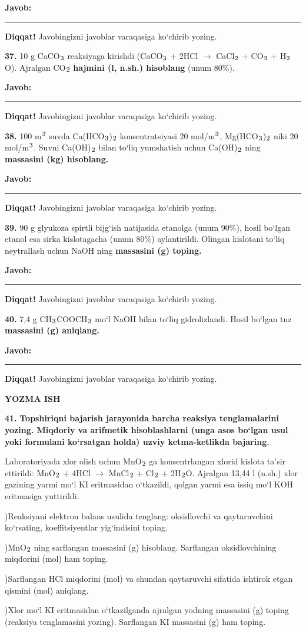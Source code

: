 \documentclass[11pt,a4paper]{article}
\renewcommand{\textsubscript}[1]{\ensuremath{_{\text{\fontsize{8}{8}\selectfont #1}}}}
\renewcommand{\textsuperscript}[1]{\ensuremath{^{\text{\fontsize{8}{8}\selectfont #1}}}}
\newcommand{\javob}{\par\smallskip\noindent\textbf{Javob:} \rule[-2pt]{7.5cm}{0.4pt}\par\smallskip\noindent\textbf{Diqqat!} Javobingizni javoblar varaqasiga ko`chirib yozing.\par\medskip}
\begin{document}
\javob
\noindent\textbf{37.} 10 g CaCO\textsubscript{3} reaksiyaga kirishdi (CaCO\textsubscript{3} + 2HCl $\to$ CaCl\textsubscript{2} + CO\textsubscript{2} + H\textsubscript{2}O). Ajralgan CO\textsubscript{2} \textbf{hajmini (l, n.sh.) hisoblang} (unum 80\%).
\javob
\noindent\textbf{38.} 100 m\textsuperscript{3} suvda Ca(HCO\textsubscript{3})\textsubscript{2} konsentratsiyasi 20 mol/m\textsuperscript{3}, Mg(HCO\textsubscript{3})\textsubscript{2} niki 20 mol/m\textsuperscript{3}. Suvni Ca(OH)\textsubscript{2} bilan to`liq yumshatish uchun Ca(OH)\textsubscript{2} ning \textbf{massasini (kg) hisoblang.}
\javob
\noindent\textbf{39.} 90 g glyukoza spirtli bijg`ish natijasida etanolga (unum 90\%), hosil bo`lgan etanol esa sirka kislotagacha (unum 80\%) aylantirildi. Olingan kislotani to`liq neytrallash uchun NaOH ning \textbf{massasini (g) toping.}
\javob
\noindent\textbf{40.} 7,4 g CH\textsubscript{3}COOCH\textsubscript{3} mo`l NaOH bilan to`liq gidrolizlandi. Hosil bo`lgan tuz \textbf{massasini (g) aniqlang.}
\javob
\par\bigskip\begin{center}\textbf{\fontsize{13}{15}\selectfont YOZMA ISH}\end{center}
\noindent\textbf{41.} \textbf{Topshiriqni bajarish jarayonida barcha reaksiya tenglamalarini yozing. Miqdoriy va arifmetik hisoblashlarni (unga asos bo`lgan usul yoki formulani ko`rsatgan holda) uzviy ketma-ketlikda bajaring.}\par\smallskip
Laboratoriyada xlor olish uchun MnO\textsubscript{2} ga konsentrlangan xlorid kislota ta'sir ettirildi: MnO\textsubscript{2} + 4HCl $\to$ MnCl\textsubscript{2} + Cl\textsubscript{2} + 2H\textsubscript{2}O. Ajralgan 13,44 l (n.sh.) xlor gazining yarmi mo`l KI eritmasidan o`tkazildi, qolgan yarmi esa issiq mo`l KOH eritmasiga yuttirildi.\par
{})Reaksiyani elektron balans usulida tenglang: oksidlovchi va qaytaruvchini ko`rsating, koeffitsiyentlar yig`indisini toping.\par
{})MnO\textsubscript{2} ning sarflangan massasini (g) hisoblang. Sarflangan oksidlovchining miqdorini (mol) ham toping.\par
{})Sarflangan HCl miqdorini (mol) va shundan qaytaruvchi sifatida ishtirok etgan qismini (mol) aniqlang.\par
{})Xlor mo`l KI eritmasidan o`tkazilganda ajralgan yodning massasini (g) toping (reaksiya tenglamasini yozing). Sarflangan KI massasini (g) ham toping.\par
\end{document}
